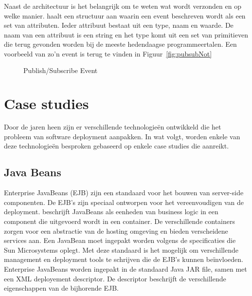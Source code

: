Naast de architectuur is het belangrijk om te weten wat wordt verzonden en op welke manier.
\citet{carzaniga2001design} haalt een structuur aan waarin een event beschreven wordt als een set van attributen.
Ieder attribuut bestaat uit een type, naam en waarde.
De naam van een attribuut is een string en het type komt uit een set van primitieven die terug gevonden worden bij de meeste hedendaagse programmeertalen.
Een voorbeeld van zo'n event is terug te vinden in Figuur~\vref{fig:pubsubNot}

\begin{figure}[!ht]
\centering
{}
\caption{Publish/Subscribe Event \citep{carzaniga2001design}}
\label{fig:pubsubNot}
\end{figure}

\section{Case studies}\label{sec:caseStudies}
Door de jaren heen zijn er verschillende technologieën ontwikkeld die het probleem van software deployment aanpakken.
In wat volgt, worden enkele van deze technologieën besproken gebaseerd op enkele case studies die \citet{softwareDeployment} aanreikt.

\subsection{Java Beans}
Enterprise JavaBeans (EJB) zijn een standaard voor het bouwen van server-side componenten.
De EJB's zijn speciaal ontworpen voor het vereenvoudigen van de deployment.
\citet{softwareDeployment} beschrijft JavaBeans als eenheden van business logic in een component die uitgevoerd wordt in een container.
De verschillende containers zorgen voor een abstractie van de hosting omgeving en bieden verscheidene services aan.
Een JavaBean moet ingepakt worden volgens de specificaties die Sun Microsystems oplegt.
Met deze standaard is het mogelijk om verschillende management en deployment tools te schrijven die de EJB's kunnen beïnvloeden.
Enterprise JavaBeans worden ingepakt in de standaard Java JAR file, samen met een XML deployement descriptor.
De descriptor beschrijft de verschillende eigenschappen van de bijhorende EJB.

